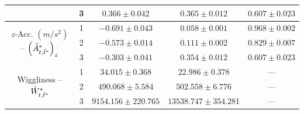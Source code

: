 \begin{table}[ht]
{\begin{tabular}{ccccc}
                                                                                       & 3                                    & $0.366 \pm 0.042$ & $0.365 \pm 0.012$ & $0.607 \pm 0.023$ \\ \hline
        \multirow{3}{*}{$z$-Acc. $(m/s^2)$ -- $\left(\tilde{A}^*_{t,\tilde t^*}\right)_z$}   & 1                                    & $-0.691 \pm 0.043$ & $0.058 \pm 0.001$ & $0.968 \pm 0.002$ \\
                                                                                       & 2                                    & $-0.573 \pm 0.014$ & $0.111 \pm 0.002$ & $0.829 \pm 0.007$ \\
                                                                                       & 3                                    & $-0.303 \pm 0.041$ & $0.354 \pm 0.012$ & $0.607 \pm 0.023$ \\ \hline
        \multirow{3}{*}{Wiggliness -- $\tilde{W}^*_{t,\tilde t^*}$}                          & 1                                    & $34.015 \pm 0.368$ & $22.986 \pm 0.378$ & ---           \\
                                                                                       & 2                                    & $490.068 \pm 5.584$ & $502.558 \pm 6.776$ & ---           \\
                                                                                       & 3                                    & $9154.156 \pm 220.765$ & $13538.747 \pm 354.281$ & ---           \\ \hline
    \end{tabular}
    }
    \label{table:emis_dists_CarHHMM-DFT}
\end{table}

